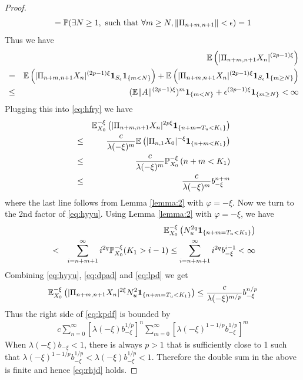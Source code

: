 \documentclass[aoas,preprint]{imsart}
\numberwithin{equation}{section}
\theoremstyle{plain}
\begin{document}
\begin{proof}
\[  =
  \P(\exists N \geq 1, \text{ such that } \forall m \geq N,
  \| \Pi_{n+m,n+1} \| < \epsilon) = 1
  \]
  Thus we have
  \begin{eqnarray*}
    &&
    \E \left(
      |\Pi_{n+m,n+1} X_n|^{(2p-1)\xi}
    \right) \\
    &=&
    \E \left(
      |\Pi_{n+m,n+1} X_n|^{(2p-1)\xi}
      \I_{S_\epsilon} \1{m < N}
    \right)
    +
    \E \left(
      |\Pi_{n+m,n+1} X_n|^{(2p-1)\xi}
      \I_{S_\epsilon} \1{m \geq N}
    \right) \\
    &\leq&
    (\E \|A\|^{(2p - 1)\xi})^m \1{m < N}
    + \epsilon^{(2p-1)\xi} \1{m \geq N} < \infty
  \end{eqnarray*}
  Plugging this into \eqref{eq:hfry} we have
  \begin{eqnarray}
    &&
    \E_{X_0}^{-\xi} \left(
      | \Pi_{n+m,n+1} X_n|^{2 p\xi}
      \1{n+m = T_u < K_1}
    \right)  \label{eq:dpad} \\
    &\leq&
    {c \over \lambda(-\xi)^m}
    \E \left(
      |\Pi_{n,1} X_0|^{-\xi}
      \1{n + m < K_1}
    \right) \nonumber \\
    &\leq&
    {c \over \lambda(-\xi)^m}
    \P_{X_0}^{-\xi} \left(
      n + m < K_1
    \right) \nonumber \\
    &\leq&
    {c \over \lambda(-\xi)^m}
    b_{-\xi}^{n+m} \nonumber 
  \end{eqnarray}
  where the last line follows from Lemma \ref{lemma:2} with
  $\varphi = -\xi$.
  Now we turn to the 2nd factor of \eqref{eq:hyyu}. Using Lemma
  \ref{lemma:2} with $\varphi = -\xi$, we have
  \begin{eqnarray}
    &&
    \E_{X_0}^{-\xi} \left(
      N_u^{2q}
      \1{n+m = T_u < K_1}
    \right) \label{eq:lpd} \\ 
    &<&
    \sum_{i=n+m+1}^\infty
    i^{2q}
    \P_{X_0}^{-\xi} (K_1 > i - 1)
    \leq
    \sum_{i=n+m+1}^\infty
    i^{2q}
    b_{-\xi}^{i-1}
    < \infty \nonumber 
  \end{eqnarray}
  Combining \eqref{eq:hyyu}, \eqref{eq:dpad} and \eqref{eq:lpd} we
  get
  \[
  \E_{X_0}^{-\xi} \left(
    | \Pi_{n+m,n+1} X_n |^{2 \xi}
    N_u^2
    \1{n+m = T_u < K_1}
  \right) 
  \leq
  {
    c \over \lambda(-\xi)^{m/p}
  }
  b_{-\xi}^{n/p}
  \]
  Thus the right side of \eqref{eq:kpdf} is bounded by
  \begin{eqnarray*}
    c
    \sum_{n=0}^\infty
    \left[ \lambda(-\xi) b_{-\xi}^{1/p} \right]^{n}
    \sum_{m=0}^\infty
    \left[ \lambda(-\xi)^{1-1/p} b_{-\xi}^{1/p} \right]^{m}
  \end{eqnarray*}
  When $\lambda(-\xi) b_{-\xi} < 1$, there is always $p > 1$
  that is sufficiently close to 1 such that
  $\lambda(-\xi)^{1-1/p} b_{-\xi}^{1/p} < \lambda(-\xi)
  b_{-\xi}^{1/p} < 1$. Therefore the double sum in the above is
  finite and hence \eqref{eq:rhjd} holds.


\end{proof}
\end{document}
